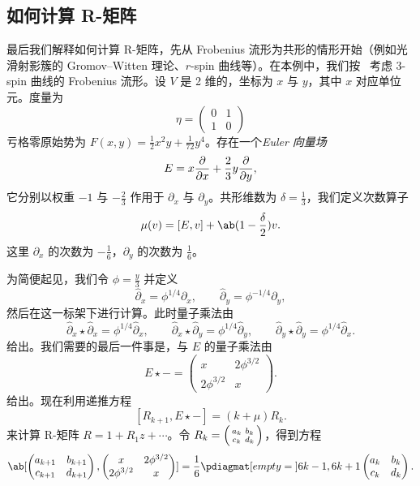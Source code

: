 \documentclass{amsart}
\theoremstyle{definition}
\theoremstyle{remark}
\theoremstyle{plain}
\theoremstyle{definition}
\theoremstyle{remark}
\newcommand{\1}{\mathbf{1}}
\newcommand{\2}{\mathbf{2}}
\newcommand{\3}{\mathbf{3}}
\begin{document}
\subsection{如何计算 R-矩阵}%
\label{sub:How to compute the R-matrix}

最后我们解释如何计算 R-矩阵，先从 Frobenius 流形为共形的情形开始（例如光滑射影簇的 Gromov--Witten 理论、\(r\)-spin 曲线等）。在本例中，我们按~\cite{PPZ2015} 考虑 3-spin 曲线的 Frobenius 流形。设 \(V\) 是 2 维的，坐标为 \(x\) 与 \(y\)，其中 \(x\) 对应单位元。度量为
\[ \eta = \begin{pmatrix}
    0 & 1 \\
    1 & 0
\end{pmatrix} \]
亏格零原始势为 \(F(x,y) = \frac{1}{2} x^2 y + \frac{1}{72} y^4\)。存在一个\textit{Euler 向量场}
\[ E = x \pdv{}{x} + \frac{2}{3} y \pdv{}{y}, \]
它分别以权重 \(-1\) 与 \(-\frac{2}{3}\) 作用于 \(\partial_x\) 与 \(\partial_y\)。共形维数为 \(\delta = \frac{1}{3}\)，我们定义次数算子
\[ \mu(v) = [E,v] + \ab(1 - \frac{\delta}{2})v. \]
这里 \(\partial_x\) 的次数为 \(-\frac{1}{6}\)，\(\partial_y\) 的次数为 \(\frac{1}{6}\)。

为简便起见，我们令 \(\phi = \frac{y}{3}\) 并定义
\[ \hat{\partial}_x = \phi^{1/4} \partial_x, \qquad \hat{\partial}_y = \phi^{-1/4} \partial_y, \]
然后在这一标架下进行计算。此时量子乘法由
\[ \hat{\partial}_x \star \hat{\partial}_x = \phi^{1/4} \hat{\partial}_x, \qquad \hat{\partial}_x \star \hat{\partial}_y = \phi^{1/4} \hat{\partial}_y, \qquad \hat{\partial}_y \star \hat{\partial}_y = \phi^{1/4} \hat{\partial}_x. \]
给出。我们需要的最后一件事是，与 \(E\) 的量子乘法由
\[ E \star - = \begin{pmatrix}
    x & 2 \phi^{3/2} \\
    2 \phi^{3/2} & x
\end{pmatrix}. \]
给出。现在利用递推方程
\[ [R_{k+1}, E \star -] = (k + \mu) R_k. \]
来计算 R-矩阵 \(R = 1 + R_1 z + \cdots\)。令 \(R_k = \begin{psmallmatrix}
    a_k & b_k \\
    c_k & d_k
\end{psmallmatrix}\)，得到方程
\[ \ab[
    \begin{pmatrix}
        a_{k+1} & b_{k+1} \\
        c_{k+1} & d_{k+1}
    \end{pmatrix}, \begin{pmatrix}
        x & 2 \phi^{3/2} \\
        2 \phi^{3/2} & x
    \end{pmatrix}
] = \frac{1}{6} \pdiagmat[empty={}]{6k-1, 6k+1} \begin{pmatrix}
    a_k & b_k \\
    c_k & d_k
\end{pmatrix}. \]
\end{document}
